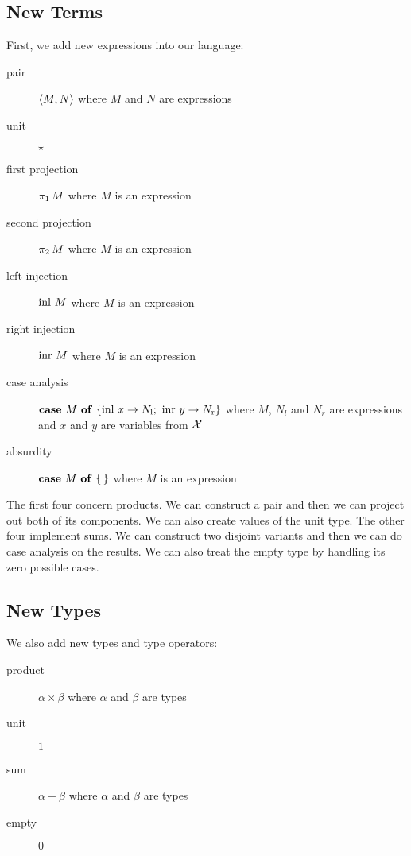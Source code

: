 \subsection{New Terms}

First, we add new expressions into our language:

\begin{description}
  \item[pair] $\left<M, N\right>$ where $M$ and $N$ are expressions
  \item[unit] $\star$
  \item[first projection] $\pi_1\,M$ where $M$ is an expression
  \item[second projection] $\pi_2\,M$ where $M$ is an expression
  \item[left injection] $\operatorname{inl}\,M$ where $M$ is an expression
  \item[right injection] $\operatorname{inr}\,M$ where $M$ is an expression
  \item[case analysis] \hspace{1mm}
    $\text{\textbf{case} $M$ \textbf{of} $\{ \operatorname{inl}\,x \to N_{\mathrm{l}};\ \operatorname{inr}\,y \to N_{\mathrm{r}} \}$}$ where $M$, $N_l$ and
    $N_r$ are expressions and $x$ and $y$ are variables from $\mathcal{X}$
  \item[absurdity] \hspace{1mm} $\text{\textbf{case} $M$ \textbf{of} \{\,\}}$ where $M$ is an expression
\end{description}

The first four concern products. We can construct a pair and then we can
project out both of its components. We can also create values of the unit
type. The other four implement sums. We can construct two disjoint variants
and then we can do case analysis on the results. We can also treat the
empty type by handling its zero possible cases.


\subsection{New Types}

We also add new types and type operators:

\begin{description}
  \item[product] $\alpha \times \beta$ where $\alpha$ and $\beta$ are types
  \item[unit] $1$
  \item[sum] $\alpha + \beta$ where $\alpha$ and $\beta$ are types
  \item[empty] $0$
\end{description}

